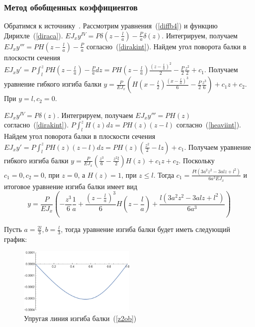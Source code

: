 \documentclass[12pt, a4paper]{article}
\begin{document}
\subsubsection{Метод обобщенных коэффициентов}
Обратимся к источнику~\cite{Birger}.
Рассмотрим уравнения~(\ref{diffb4}) и функцию Дирихле~(\ref{diraca}). 
$E J_{x} y^{IV} = P \delta (z - \frac {l}{a}) - \frac{P}{a} \delta (z)$. Интегрируем, получаем $E J_{x} y''' = P H (z - \frac {l}{a}) - \frac{P}{a}$ согласно~(\ref{dirakint}).
Найдем угол поворота балки в плоскости сечения $E J_{x} y' = P \int_l^z P H (z - \frac {l}{a}) - \frac{P}{a} dz = P H(z - \frac{l}{a})\frac{(z - \frac{l}{a})^2}{2} - \frac{P}{2} \frac{z^2}{2} + c_1$.
Получаем уравнение гибкого изгиба балки $y = \frac{P}{E J_{x}}( H(x - \frac{l}{2})\frac{(x - \frac{l}{a})^3}{6} - \frac{P}{2} \frac{z^3}{6} ) + c_1 z + c_2$.
При $y = l, c_2 = 0$.

$E J_{x} y^{IV} = P \delta (z)$. Интегрируем, получаем $E J_{x} y''' = P H (z)$ согласно~(\ref{dirakint}). $P \int_l^z  H (z) dz = P H (z) (z - l)$ согласно~(\ref{heaviint}). Найдем угол поворота балки в плоскости сечения $E J_{x} y' = P \int_l^z P H (z) (z - l) dz = P H(z)(\frac{z^2}{2} - l z) + c_1$. Получаем уравнение гибкого изгиба балки $y = \frac{P}{E J_{x}} (\frac{z^3}{6} - \frac{z^2 l}{2}) H(z) + c_1 z + c_2$. Поскольку $c_1 = 0, c_2 = 0 \mbox{, при } z = 0$, а $H(z) = 1 \mbox{, при } z \leqslant l$. Тогда $c_1 = \frac{P l(3 a^2 z^2 - 3 a l z + l^2)}{6 a^3 E J_{x}}$ и  итоговое уравнение изгиба балки имеет вид
\begin{equation}
	\label{z2ob}
	y = \frac{P}{E J_{x}} (-\frac{z^3}{6} \frac{1}{a} + \frac{(z - \frac{l}{a})^3}{6} H(z - \frac{l}{a}) + \frac{l(3 a^2 z^2 - 3 a l z + l^2)}{6 a^3})
\end{equation}

Пусть $a = \frac{2 l}{3}, b = \frac{l}{3}$, тогда уравнение изгиба балки будет иметь следующий график:
\begin{figure}[!h]
	\centering
	\includegraphics[width=0.5\textwidth]{g.4}%
	\caption{Упругая линия изгиба балки~(\ref{z2ob})}
	\vspace*{-2mm}
	\label{g4}
\end{figure}
\end{document}
